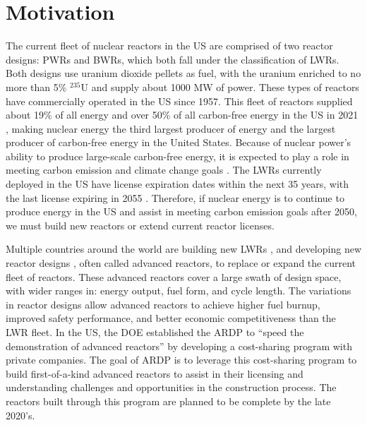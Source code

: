 \section{Motivation}
The current fleet of nuclear reactors in the US are comprised 
of two reactor designs: \glspl{PWR} and \glspl{BWR}, 
which both fall under the classification of \glspl{LWR}.
Both designs use uranium dioxide pellets as fuel, with the uranium 
enriched to no more than 5\% $^{235}$U and supply about 1000 MW of 
power. These types of reactors 
have commercially operated in the US since 1957. This fleet of 
reactors supplied about 19\% of all energy and over 50\%  
of all carbon-free energy in the US in 2021 
\cite{us_energy_information_administration_electricity_2022}, making nuclear 
energy the third largest producer of energy and the largest 
producer of carbon-free energy in the United States. Because of nuclear 
power's ability to produce large-scale carbon-free energy, it is 
expected to play a role in meeting carbon emission and climate change 
goals \cite{nea_meeting_2022}. The \glspl{LWR} 
currently deployed in the US have license expiration dates within 
the next 35 years, with the last license expiring in 2055 
\cite{nuclear_energy_institute_us_2021}. Therefore, if nuclear energy is 
to continue to produce energy in the US and assist in meeting carbon 
emission goals after 2050, we must build new reactors or extend current 
reactor licenses. 

Multiple countries around the world are building new \glspl{LWR}
\cite{world_nuclear_association_plans_2022}, and developing
new reactor designs \cite{hussain_advances_2018}, often called 
advanced reactors, to 
replace or expand the current fleet of reactors. These advanced reactors 
cover a large swath of design space, with wider ranges in: energy output, 
fuel form, and cycle length. The variations in reactor designs allow 
advanced reactors to achieve higher fuel burnup, improved safety 
performance, and better economic competitiveness than the \gls{LWR} fleet. 
In the US, the \gls{DOE} established the \gls{ARDP} 
\cite{us_department_of_energy_office_of_nuclear_energy_advanced_nodate}
to ``speed the demonstration of advanced reactors'' 
\cite{us_department_of_energy_office_of_nuclear_energy_advanced_nodate}
by developing a cost-sharing program with private companies. The goal of 
\gls{ARDP} is to leverage this cost-sharing program to build 
first-of-a-kind advanced reactors to assist in their licensing and 
understanding challenges and opportunities in the construction process. 
The reactors built through this program are planned to be complete by the 
late 2020's.

